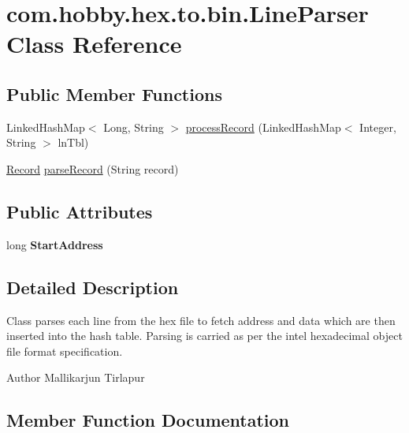 \hypertarget{classcom_1_1hobby_1_1hex_1_1to_1_1bin_1_1_line_parser}{}\section{com.\+hobby.\+hex.\+to.\+bin.\+Line\+Parser Class Reference}
\label{classcom_1_1hobby_1_1hex_1_1to_1_1bin_1_1_line_parser}
\subsection*{Public Member Functions}
\begin{DoxyCompactItemize}
\item 
Linked\+Hash\+Map$<$ Long, String $>$ \hyperlink{classcom_1_1hobby_1_1hex_1_1to_1_1bin_1_1_line_parser_acfc2f3e7d365d31f5e7603a4e86c4671}{process\+Record} (Linked\+Hash\+Map$<$ Integer, String $>$ ln\+Tbl)
\item 
\hyperlink{classcom_1_1hobby_1_1hex_1_1to_1_1bin_1_1_record}{Record} \hyperlink{classcom_1_1hobby_1_1hex_1_1to_1_1bin_1_1_line_parser_a1c5410cda3414d551d912fe5821c9f85}{parse\+Record} (String record)
\end{DoxyCompactItemize}
\subsection*{Public Attributes}
\begin{DoxyCompactItemize}
\item 
\mbox{\label{classcom_1_1hobby_1_1hex_1_1to_1_1bin_1_1_line_parser_a411062955e40e07d7342e519271b4fa2}} 
long {\bfseries Start\+Address}
\end{DoxyCompactItemize}


\subsection{Detailed Description}
Class parses each line from the hex file to fetch address and data which are then inserted into the hash table. Parsing is carried as per the intel hexadecimal object file format specification.

\begin{DoxyAuthor}{Author}
Mallikarjun Tirlapur 
\end{DoxyAuthor}


\subsection{Member Function Documentation}
\mbox{\label{classcom_1_1hobby_1_1hex_1_1to_1_1bin_1_1_line_parser_a1c5410cda3414d551d912fe5821c9f85}} 
